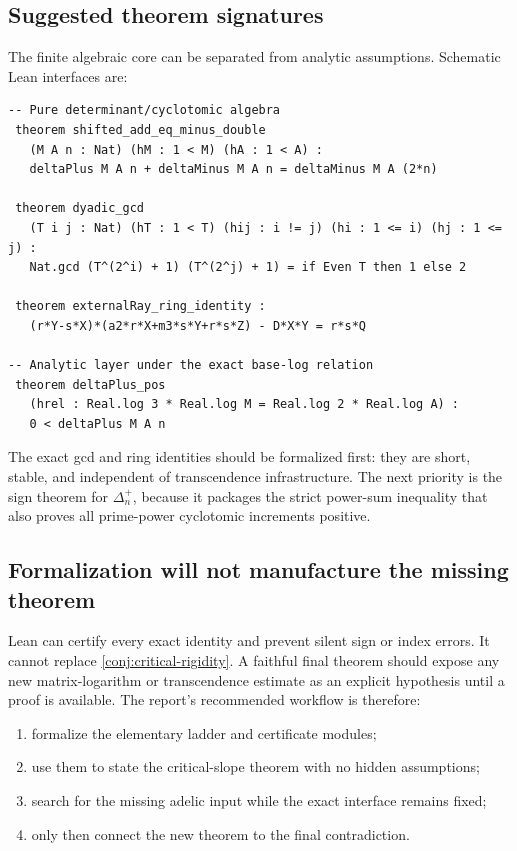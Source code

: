 \documentclass[11pt]{article}
\theoremstyle{definition}
\begin{document}
\subsection{Suggested theorem signatures}

The finite algebraic core can be separated from analytic assumptions.  Schematic Lean
interfaces are:

\begin{lstlisting}[language={},caption={Schematic Lean interfaces, not compiled code.}]
-- Pure determinant/cyclotomic algebra
 theorem shifted_add_eq_minus_double
   (M A n : Nat) (hM : 1 < M) (hA : 1 < A) :
   deltaPlus M A n + deltaMinus M A n = deltaMinus M A (2*n)

 theorem dyadic_gcd
   (T i j : Nat) (hT : 1 < T) (hij : i != j) (hi : 1 <= i) (hj : 1 <= j) :
   Nat.gcd (T^(2^i) + 1) (T^(2^j) + 1) = if Even T then 1 else 2

 theorem externalRay_ring_identity :
   (r*Y-s*X)*(a2*r*X+m3*s*Y+r*s*Z) - D*X*Y = r*s*Q

-- Analytic layer under the exact base-log relation
 theorem deltaPlus_pos
   (hrel : Real.log 3 * Real.log M = Real.log 2 * Real.log A) :
   0 < deltaPlus M A n
\end{lstlisting}

The exact gcd and ring identities should be formalized first: they are short, stable, and
independent of transcendence infrastructure.  The next priority is the sign theorem for
$\Delta_n^+$, because it packages the strict power-sum inequality that also proves all
prime-power cyclotomic increments positive.

\subsection{Formalization will not manufacture the missing theorem}

Lean can certify every exact identity and prevent silent sign or index errors.  It cannot
replace \cref{conj:critical-rigidity}.  A faithful final theorem should expose any new
matrix-logarithm or transcendence estimate as an explicit hypothesis until a proof is
available.  The report's recommended workflow is therefore:
\begin{enumerate}
\item formalize the elementary ladder and certificate modules;
\item use them to state the critical-slope theorem with no hidden assumptions;
\item search for the missing adelic input while the exact interface remains fixed;
\item only then connect the new theorem to the final contradiction.
\end{enumerate}
\end{document}
